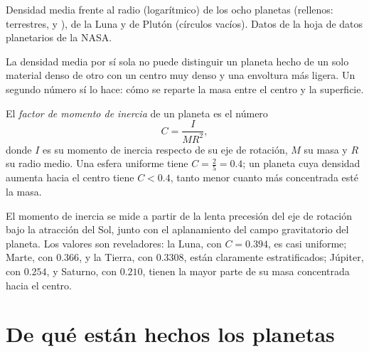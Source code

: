 \begin{omfigure}
{\small Densidad media frente al radio (logarítmico) de los ocho planetas (rellenos:
terrestres,  y ), de la Luna y de Plutón (círculos vacíos).
Datos de la hoja de datos planetarios de la NASA.}
\end{omfigure}

La densidad media por sí sola no puede distinguir un planeta hecho de un solo material denso
de otro con un centro muy denso y una envoltura más ligera. Un segundo número sí lo hace: cómo
se reparte la masa entre el centro y la superficie.

\begin{definition}\label{def:b1:comparative-planetology:moi}
El \emph{factor de momento de inercia} de un planeta es el
número
\[
  C = \frac{I}{MR^2} ,
\]
donde $I$ es su momento de inercia respecto de su eje de rotación, $M$ su masa y $R$ su radio
medio. Una esfera uniforme tiene $C = \tfrac25 = 0.4$; un planeta cuya densidad aumenta hacia
el centro tiene $C < 0.4$, tanto menor cuanto más concentrada esté la masa.
\end{definition}

El momento de inercia se mide a partir de la lenta precesión del eje de rotación bajo la
atracción del Sol, junto con el aplanamiento del campo gravitatorio del planeta. Los valores son
reveladores: la Luna, con $C = 0.394$, es casi uniforme; Marte, con $0.366$, y la Tierra, con
$0.3308$, están claramente estratificados; Júpiter, con $0.254$, y Saturno, con $0.210$, tienen
la mayor parte de su masa concentrada hacia el centro.

\section{De qué están hechos los planetas}

